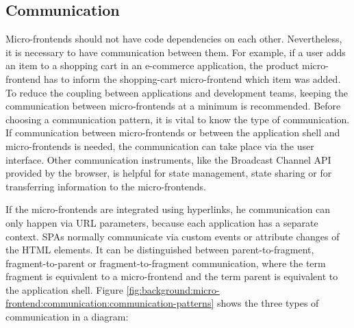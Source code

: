 \subsection{Communication}\label{subsection:background:micro-frontend:communication-patterns}

Micro-frontends should not have code dependencies on each other. Nevertheless, it is necessary to have communication between them. For example, if a user adds an item to a shopping cart in an e-commerce application, the product micro-frontend has to inform the shopping-cart micro-frontend which item was added. To reduce the coupling between applications and development teams, keeping the communication between micro-frontends at a minimum is recommended. Before choosing a communication pattern, it is vital to know the type of communication. If communication between micro-frontends or between the application shell and micro-frontends is needed, the communication can take place via the user interface. \cite{book:2020:geers:background:micro-frontends:micro-frontends-in-action} Other communication instruments, like the Broadcast Channel \ac{API} provided by the browser, is helpful for state management, state sharing or for transferring information to the micro-frontends. \cite{misc:-:background:micro-frontends:broadcast-channel-api} 

\bigskip

\noindent If the micro-frontends are integrated using hyperlinks, he communication can only happen via \ac{URL} parameters, because each application has a separate context. \acp{SPA} normally communicate via custom events or attribute changes of the \ac{HTML} elements. \cite[100]{book:2020:geers:background:micro-frontends:micro-frontends-in-action} \cite[315-316]{book:2019:farrell:background:micro-frontends:web-components-in-action} It can be distinguished between parent-to-fragment, fragment-to-parent or fragment-to-fragment communication, where the term fragment is equivalent to a micro-frontend and the term parent is equivalent to the application shell. \cite{book:2020:geers:background:micro-frontends:micro-frontends-in-action} Figure \ref{fig:background:micro-frontend:communication:communication-patterns} shows the three types of communication in a diagram:

